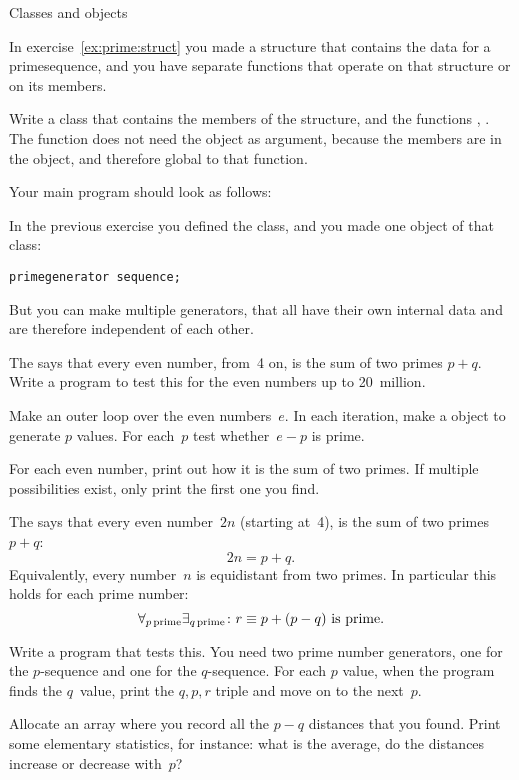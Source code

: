  {Classes and objects}

\prerequisite{\ref{sec:object}, \ref{sec:objectf}}

In exercise~\ref{ex:prime:struct} you made a structure that contains
the data for a primesequence, and you have separate functions that
operate on that structure or on its members.

\begin{exercise}
  \label{ex:prime:sequence}
  Write a class  that contains the members of the
  structure, and the functions , . The
  function  does not need the object as argument,
  because the members are in the object, and therefore global
  to that function.

  Your main program should look as follows:
\end{exercise}

In the previous exercise you defined the  class, and
you made one object of that class:
\begin{verbatim}
primegenerator sequence;
\end{verbatim}
But you can make multiple generators, that all have their own internal
data and are therefore independent of each other.

\begin{exercise}
  \label{ex:goldbach:conj}
  The  says that every even number,
  from~4 on, is the sum of two primes $p+q$. Write a program to test this
  for the even numbers up to 20~million.

  Make an outer loop over the even numbers~$e$. In each iteration,
  make a  object to generate $p$ values.
  For each~$p$ test whether~$e-p$ is prime.

  For each even number, print out how it is the sum of two primes. If
  multiple possibilities exist, only print the first one you find.
\end{exercise}

\begin{exercise}
  \label{ex:prime:goldbach-pqr}
  The  says that every even number~$2n$
  (starting at~4), is the sum of two primes $p+q$: \[ 2n=p+q.\]
  Equivalently, every number~$n$ is equidistant from two primes. In
  particular this holds for each prime number:
  \[ \forall_{p\,\mathrm{prime}}\exists_{q\,\mathrm{prime}}\colon
  \hbox{$r\equiv p+(p-q)$ is prime}. \]

  Write a program that tests this. You need two prime number
  generators, one for the $p$-sequence and one for the $q$-sequence.
  For each $p$ value, 
  when the program finds the $q$~value, print the $q,p,r$ triple and
  move on to the next~$p$.

  Allocate an array where you record all the $p-q$ distances that you
  found. Print some elementary statistics, for instance: what is the average, do the
  distances increase or decrease with~$p$?
\end{exercise}

